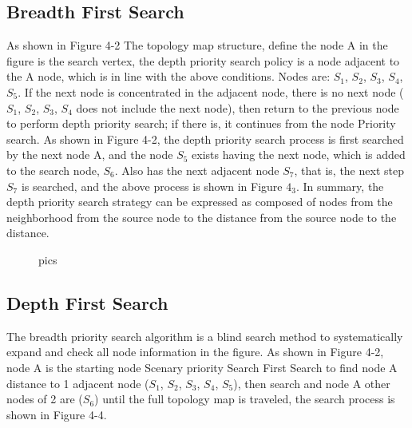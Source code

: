 \documentclass[conference]{IEEEtran}
\begin{document}
\subsection{Breadth First Search}
\par
As shown in Figure 4-2 The topology map structure, define the node A in the figure is the search vertex, the depth priority search policy is a node adjacent to the A node, which is in line with the above conditions. Nodes are: $S_1$, $S_2$, $S_3$, $S_4$, $S_5$. If the next node is concentrated in the adjacent node, there is no next node ($S_1$, $S_2$, $S_3$, $S_4$ does not include the next node), then return to the previous node to perform depth priority search; if there is, it continues from the node Priority search. As shown in Figure 4-2, the depth priority search process is first searched by the next node A, and the node $S_5$ exists having the next node, which is added to the search node, $S_6$. Also has the next adjacent node $S_7$, that is, the next step $S_7$ is searched, and the above process is shown in Figure $4_3$. In summary, the depth priority search strategy can be expressed as composed of nodes from the neighborhood from the source node to the distance from the source node to the distance.

\begin{figure}[htbp]
    \centering
    \centering
    \caption{ pics}
\end{figure}

\subsection{Depth First Search}
\par
The breadth priority search algorithm is a blind search method to systematically expand and check all node information in the figure. As shown in Figure 4-2, node A is the starting node Scenary priority Search First Search to find node A distance to 1 adjacent node ($S_1$, $S_2$, $S_3$, $S_4$, $S_5$), then search and node A other nodes of 2 are ($S_6$) until the full topology map is traveled, the search process is shown in Figure 4-4.
\end{document}
